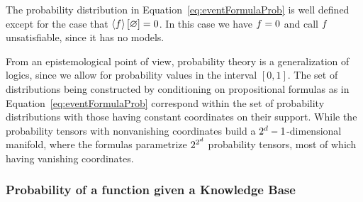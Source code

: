 % 
The probability distribution in Equation~\eqref{eq:eventFormulaProb} is well defined except for the case that $\left\langle f\right\rangle \left[ \varnothing \right]=0$.
In this case we have $f=0$ and call $f$ unsatisfiable, since it has no models.




From an epistemological point of view, probability theory is a generalization of logics, since we allow for probability values in the interval $[0,1]$.
The set of distributions being constructed by conditioning on propositional formulas as in Equation~\eqref{eq:eventFormulaProb} correspond within the set of probability distributions with those having constant coordinates on their support.
While the probability tensors with nonvanishing coordinates build a $2^d-1$-dimensional manifold, where the formulas parametrize $2^{2^d}$ probability tensors, most of which having vanishing coordinates.




\subsubsection{Probability of a function given a Knowledge Base}

